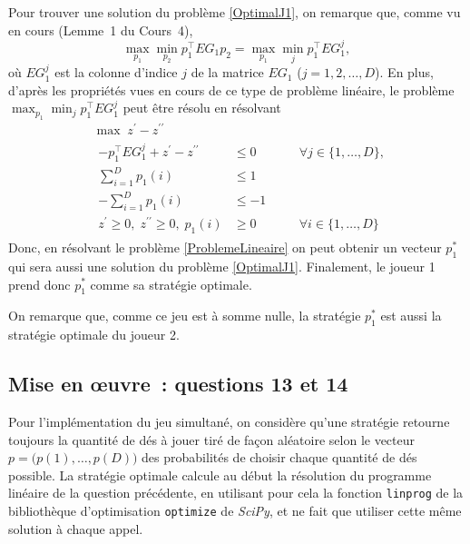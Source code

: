 \documentclass[a4paper,11pt]{amsart}
\theoremstyle{plain}
\begin{document}
Pour trouver une solution du problème \eqref{OptimalJ1}, on remarque que, comme vu en cours (Lemme~1 du Cours~4),
\[
\max_{p_1} \min_{p_2} p_1^\top EG_1 p_2 = \max_{p_1} \min_{j} p_1^\top EG_1^j,
\]
où $EG_1^j$ est la colonne d'indice $j$ de la matrice $EG_1$ ($j = 1, 2, \dotsc, D$). En plus, d'après les propriétés vues en cours de ce type de problème linéaire, le problème $\max_{p_1} \min_{j} p_1^\top EG_1^j$ peut être résolu en résolvant
\begin{equation}
\label{ProblemeLineaire}
\begin{aligned}
& \max\; z^\prime - z^{\prime\prime} \\
& \begin{aligned}
- p_1^\top EG_1^j + z^\prime - z^{\prime\prime} & \leq 0 & \quad & \forall j \in \{1, \dotsc, D\}, \\
\textstyle\sum_{i=1}^D p_1(i) & \leq 1 \\
\textstyle-\sum_{i=1}^D p_1(i) & \leq -1 \\
z^\prime \geq 0,\; z^{\prime\prime}\geq 0,\; p_1(i) & \geq 0 & & \forall i \in \{1, \dotsc, D\}
\end{aligned}
\end{aligned}
\end{equation}
Donc, en résolvant le problème \eqref{ProblemeLineaire} on peut obtenir un vecteur $p_1^\ast$ qui sera aussi une solution du problème \eqref{OptimalJ1}. Finalement, le joueur 1 prend donc $p_1^\ast$ comme sa stratégie optimale.

On remarque que, comme ce jeu est à somme nulle, la stratégie $p_1^\ast$ est aussi la stratégie optimale du joueur 2.

\subsection{Mise en \oe{}uvre~: questions 13 et 14}

Pour l'implémentation du jeu simultané, on considère qu'une stratégie retourne toujours la quantité de dés à jouer tiré de façon aléatoire selon le vecteur $p = \bigl(p(1), \dotsc, p(D)\bigr)$ des probabilités de choisir chaque quantité de dés possible. La stratégie optimale calcule au début la résolution du programme linéaire de la question précédente, en utilisant pour cela la fonction \texttt{linprog} de la bibliothèque d'optimisation \texttt{optimize} de \emph{SciPy}, et ne fait que utiliser cette même solution à chaque appel. 
\end{document}
